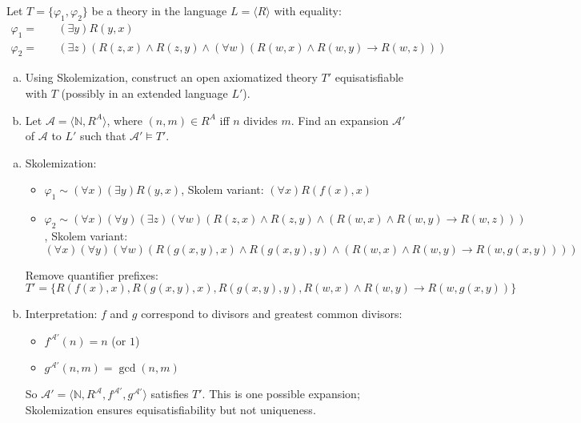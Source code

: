 \begin{problem}

    Let $T=\{\varphi_1,\varphi_2\}$ be a theory in the language $L=\langle R\rangle$ with equality:
    \begin{align*}
    \varphi_1=&\quad (\exists y)R(y,x)\\
    \varphi_2=&\quad (\exists z)(R(z,x)\wedge R(z,y)\wedge (\forall w)(R(w,x) \wedge R(w,y)\to R(w,z)))
    \end{align*}
    \begin{enumerate}[(a)]
        \item Using Skolemization, construct an open axiomatized theory $T'$ equisatisfiable with $T$ (possibly in an extended language $L'$).
        \item Let $\mathcal{A}=\langle\mathbb{N},R^A\rangle$, where $(n,m)\in R^A$ iff $n$ divides $m$. Find an expansion $\mathcal{A}'$ of $\mathcal{A}$ to $L'$ such that $\mathcal{A}'\models T'$.
    \end{enumerate}

    \begin{solution}
        \begin{enumerate}[(a)]
            \item Skolemization:
            \begin{itemize}
                \item $\varphi_1\sim (\forall x)(\exists y)R(y,x)$, Skolem variant: $(\forall x)R(f(x),x)$
                \item $\varphi_2\sim (\forall x)(\forall y)(\exists z)(\forall w)(R(z,x)\wedge R(z,y)\wedge (R(w,x) \wedge R(w,y)\to R(w,z)))$, Skolem variant: $(\forall x)(\forall y)(\forall w)(R(g(x,y),x)\wedge R(g(x,y),y)\wedge (R(w,x) \wedge R(w,y)\to R(w,g(x,y))))$
            \end{itemize}
            Remove quantifier prefixes:
            $$
            T'=\{R(f(x),x), R(g(x,y),x), R(g(x,y),y), R(w,x) \wedge R(w,y)\to R(w,g(x,y))\}
            $$
            \item Interpretation: $f$ and $g$ correspond to divisors and greatest common divisors:
            \begin{itemize}
                \item $f^{\mathcal A'}(n)=n$ (or $1$)
                \item $g^{\mathcal A'}(n,m)=\gcd(n,m)$
            \end{itemize}
            So $\mathcal A'=\langle\mathbb N,R^\mathcal A,f^{\mathcal A'},g^{\mathcal A'}\rangle$ satisfies $T'$. This is one possible expansion; Skolemization ensures equisatisfiability but not uniqueness.
        \end{enumerate}
    \end{solution}

\end{problem}


